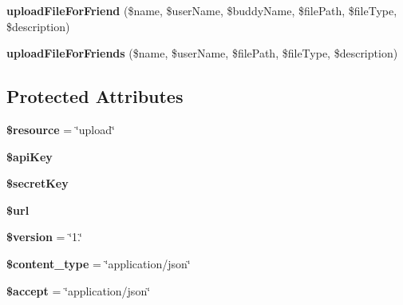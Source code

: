 \begin{DoxyCompactItemize}
\item 
\hypertarget{class_upload_service_a1e5ff8aeb75d04ed9aedae255f50cfb0}{{\bfseries upload\+File\+For\+Friend} (\$name, \$user\+Name, \$buddy\+Name, \$file\+Path, \$file\+Type, \$description)}\label{class_upload_service_a1e5ff8aeb75d04ed9aedae255f50cfb0}

\item 
\hypertarget{class_upload_service_a51effa802b9d9611667208cf5d6f1c1f}{{\bfseries upload\+File\+For\+Friends} (\$name, \$user\+Name, \$file\+Path, \$file\+Type, \$description)}\label{class_upload_service_a51effa802b9d9611667208cf5d6f1c1f}

\end{DoxyCompactItemize}
\subsection*{Protected Attributes}
\begin{DoxyCompactItemize}
\item 
\hypertarget{class_upload_service_abd4c7b8b084214b8d2533ba07fce6b83}{{\bfseries \$resource} = \char`\"{}upload\char`\"{}}\label{class_upload_service_abd4c7b8b084214b8d2533ba07fce6b83}

\item 
\hypertarget{class_upload_service_a084e3db37d1b117a3cc7212cf2eed533}{{\bfseries \$api\+Key}}\label{class_upload_service_a084e3db37d1b117a3cc7212cf2eed533}

\item 
\hypertarget{class_upload_service_a766bfb236de2f29a3680976ca22790d4}{{\bfseries \$secret\+Key}}\label{class_upload_service_a766bfb236de2f29a3680976ca22790d4}

\item 
\hypertarget{class_upload_service_acf215f34a917d014776ce684a9ee8909}{{\bfseries \$url}}\label{class_upload_service_acf215f34a917d014776ce684a9ee8909}

\item 
\hypertarget{class_upload_service_a17c8948c68aa44fa9961ae169b6a8961}{{\bfseries \$version} = \char`\"{}1.\char`\"{}}\label{class_upload_service_a17c8948c68aa44fa9961ae169b6a8961}

\item 
\hypertarget{class_upload_service_ae754d6373f275e781f47c8bc9b994b6d}{{\bfseries \$content\+\_\+type} = \char`\"{}application/json\char`\"{}}\label{class_upload_service_ae754d6373f275e781f47c8bc9b994b6d}

\item 
\hypertarget{class_upload_service_a75fc18c4ff06288ff9fdf8aba9bd1081}{{\bfseries \$accept} = \char`\"{}application/json\char`\"{}}\label{class_upload_service_a75fc18c4ff06288ff9fdf8aba9bd1081}

\end{DoxyCompactItemize}
